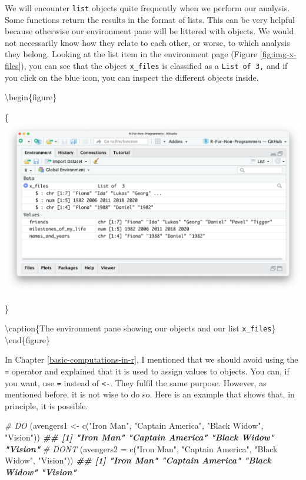 \documentclass[
]{book}
\newenvironment{Shaded}{\begin{snugshade}}{\end{snugshade}}
\newcommand{\AttributeTok}[1]{\textcolor[rgb]{0.77,0.63,0.00}{#1}}
\newcommand{\CommentTok}[1]{\textcolor[rgb]{0.56,0.35,0.01}{\textit{#1}}}
\newcommand{\DocumentationTok}[1]{\textcolor[rgb]{0.56,0.35,0.01}{\textbf{\textit{#1}}}}
\newcommand{\FunctionTok}[1]{\textcolor[rgb]{0.00,0.00,0.00}{#1}}
\newcommand{\NormalTok}[1]{#1}
\newcommand{\OtherTok}[1]{\textcolor[rgb]{0.56,0.35,0.01}{#1}}
\newcommand{\StringTok}[1]{\textcolor[rgb]{0.31,0.60,0.02}{#1}}
\begin{document}
We will encounter \texttt{list} objects quite frequently when we perform our analysis. Some functions return the results in the format of lists. This can be very helpful because otherwise our environment pane will be littered with objects. We would not necessarily know how they relate to each other, or worse, to which analysis they belong. Looking at the list item in the environment page (Figure \ref{fig:img-x-files}), you can see that the object \texttt{x\_files} is classified as a \texttt{List\ of\ 3,} and if you click on the blue icon, you can inspect the different objects inside.

\textbackslash begin\{figure\}

\{\centering \includegraphics[width=38.67in]{images/chapter_05_img/02_basic_computation_environment_lists}

\}

\textbackslash caption\{The environment pane showing our objects and our list \texttt{x\_files}\}\label{fig:img-x-files}
\textbackslash end\{figure\}

In Chapter \ref{basic-computations-in-r}, I mentioned that we should avoid using the \texttt{=} operator and explained that it is used to assign values to objects. You can, if you want, use \texttt{=} instead of \texttt{\textless{}-}. They fulfil the same purpose. However, as mentioned before, it is not wise to do so. Here is an example that shows that, in principle, it is possible.

\begin{Shaded}
\begin{Highlighting}[]
\CommentTok{\# DO}
\NormalTok{(avengers1 }\OtherTok{\textless{}{-}} \FunctionTok{c}\NormalTok{(}\StringTok{"Iron Man"}\NormalTok{, }\StringTok{"Captain America"}\NormalTok{, }\StringTok{"Black Widow"}\NormalTok{, }\StringTok{"Vision"}\NormalTok{))}
\DocumentationTok{\#\# [1] "Iron Man"        "Captain America" "Black Widow"     "Vision"}
\CommentTok{\# DON\textquotesingle{}T}
\NormalTok{(}\AttributeTok{avengers2 =} \FunctionTok{c}\NormalTok{(}\StringTok{"Iron Man"}\NormalTok{, }\StringTok{"Captain America"}\NormalTok{, }\StringTok{"Black Widow"}\NormalTok{, }\StringTok{"Vision"}\NormalTok{))}
\DocumentationTok{\#\# [1] "Iron Man"        "Captain America" "Black Widow"     "Vision"}
\end{Highlighting}
\end{Shaded}
\end{document}

